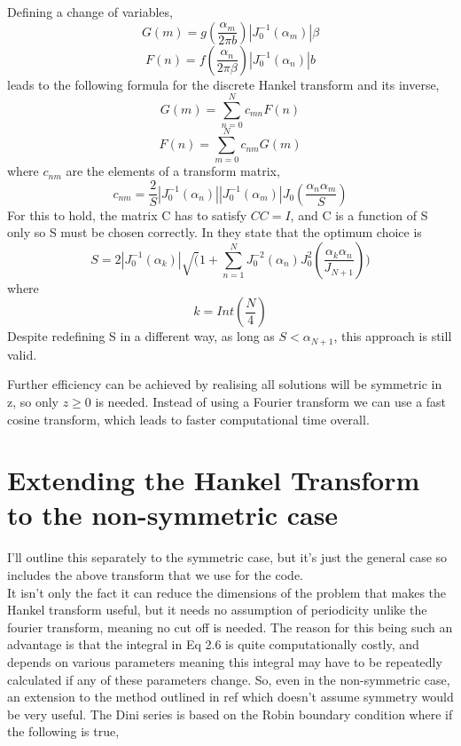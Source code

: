 \documentclass[10pt]{article}
\numberwithin{equation}{section}
\begin{document}
\begin{multicols}{2}
Defining a change of variables, 
\begin{equation}
G(m) = g(\frac{\alpha_{m}}{2\pi b})|J_{0}^{-1}(\alpha_{m})|\beta
\end{equation}
\begin{equation}
F(n) = f(\frac{\alpha_{n}}{2\pi \beta})|J_{0}^{-1}(\alpha_{n})|b
\end{equation}
leads to the following formula for the discrete Hankel transform and its inverse,
\begin{equation}
G(m) = \sum_{n=0}^{N}c_{mn}F(n)
\end{equation}
\begin{equation}
F(n) =  \sum_{m=0}^{N}c_{nm}G(m)
\end{equation}
where $c_{nm}$ are the elements of a transform matrix, 
\begin{equation}
c_{nm} = \frac{2}{S}|J_{0}^{-1}(\alpha_{n})||J_{0}^{-1}(\alpha_{m})|J_{0}(\frac{\alpha_{n}\alpha_{m}}{S})
\end{equation}
For this to hold, the matrix C has to satisfy $CC =I$, and C is a function of S only so S must be chosen correctly. In \cite{Kai_Ming_2009} they state that the optimum choice is 
\begin{equation}
S = 2|J_{0}^{-1}(\alpha_{k})|\sqrt(1+\sum_{n=1}^{N}J_{0}^{-2}(\alpha_{n})J_{0}^{2}(\frac{\alpha_{k}\alpha_{n}}{J_{N+1}}))
\end{equation}
where 
\begin{equation}
k = Int(\frac{N}{4})
\end{equation}
Despite redefining S in a different way, as long as $S<\alpha_{N+1}$, this approach is still valid.
 
  Further efficiency can be achieved by realising all solutions will be symmetric in z, so only $z\geqslant0$ is needed. Instead of using a Fourier transform we can use a fast cosine transform, which leads to faster computational time overall.
  
\section{Extending the Hankel Transform to the non-symmetric case}

I'll outline this separately to the symmetric case, but it's just the general case so includes the above transform that we use for the code. 
\\
It isn't only the fact it can reduce the dimensions of the problem that makes the Hankel transform useful, but it needs no assumption of periodicity unlike the fourier transform, meaning no cut off is needed. The reason for this being such an advantage is that the integral in Eq 2.6 is quite computationally costly, and depends on various parameters meaning this integral may have to be repeatedly calculated if any of these parameters change. So, even in the non-symmetric case, an extension to the method outlined in ref \cite{Kai_Ming_2009} which doesn't assume symmetry would be very useful.
The Dini series is based on the Robin boundary condition where if the following is true,


\end{multicols}
\end{document}
